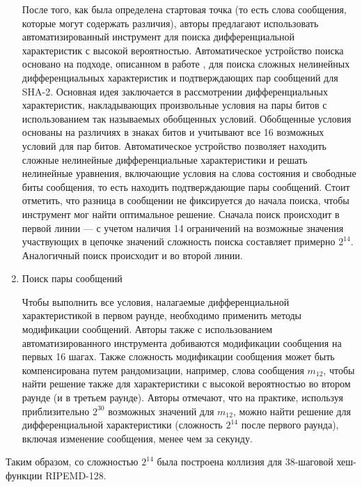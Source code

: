 \documentclass{./civarticle}
\begin{document}
\begin{enumerate}
    После того, как была определена стартовая точка (то есть слова сообщения, которые могут содержать различия), авторы предлагают использовать автоматизированный инструмент для поиска дифференциальной характеристик с высокой вероятностью. Автоматическое устройство поиска основано на подходе, описанном в работе \cite{ripemdat3}, для поиска сложных нелинейных дифференциальных характеристик и подтверждающих пар сообщений для SHA-2. Основная идея заключается в рассмотрении дифференциальных характеристик, накладывающих произвольные условия на пары битов с использованием так называемых обобщенных условий. Обобщенные условия основаны на различиях в знаках битов и учитывают все 16 возможных условий для пар битов. Автоматическое устройство позволяет находить сложные нелинейные дифференциальные характеристики и решать нелинейные уравнения, включающие условия на слова состояния и свободные биты сообщения, то есть находить подтверждающие пары сообщений. Стоит отметить, что разница в сообщении не фиксируется до начала поиска, чтобы инструмент мог найти оптимальное решение. Сначала поиск происходит в первой линии --- с учетом наличия 14 ограничений на возможные значения участвующих в цепочке значений сложность поиска составляет примерно $2^{14}$. Аналогичный поиск происходит и во второй линии. 
    
    \item Поиск пары сообщений

    Чтобы выполнить все условия, налагаемые дифференциальной характеристикой в первом раунде, необходимо применить методы модификации сообщений. Авторы также с использованием автоматизированного инструмента добиваются модификации сообщения на первых 16 шагах. Также сложность модификации сообщения может быть компенсирована путем рандомизации, например, слова сообщения $m_{12}$, чтобы найти решение также для характеристики с высокой вероятностью во втором раунде (и в третьем раунде). Авторы отмечают, что на практике, используя приблизительно $2^{30}$ возможных значений для $m_{12}$, можно найти решение для дифференциальной характеристики (сложность $2^{14}$ после первого раунда), включая изменение сообщения, менее чем за секунду.
    
\end{enumerate}

Таким образом, со сложностью $2^{14}$ была построена коллизия для 38-шаговой хеш-функции RIPEMD-128.

\begin{figure}[h!]
        \end{figure}
\end{document}
